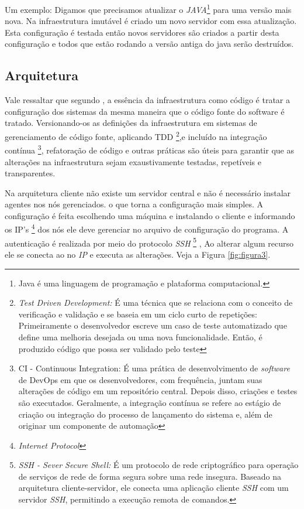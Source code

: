  Um exemplo: Digamos que precisamos atualizar o \textit{JAVA}\footnote{Java é uma linguagem de programação e plataforma computacional.} para uma versão mais nova. Na infraestrutura imutável é criado um novo servidor com essa atualização. Esta configuração é testada então novos servidores são criados a partir desta configuração e todos que estão rodando a versão antiga do java serão destruídos. 
 
\subsection{Arquitetura}

Vale ressaltar que segundo , a essência da infraestrutura como código é tratar a configuração dos sistemas da mesma maneira que o código fonte do software é tratado. Versionando-os as definições da infraestrutura em sistemas de gerenciamento de código fonte, aplicando TDD \footnote{\textit{Test Driven Development:} É uma técnica que se relaciona com o conceito de verificação e validação e se baseia em um ciclo curto de repetições: Primeiramente o desenvolvedor escreve um caso de teste automatizado que define uma melhoria desejada ou uma nova funcionalidade. Então, é produzido código que possa ser validado pelo teste},e incluído na integração contínua \footnote{CI - Continuous Integration: É uma prática de desenvolvimento de \textit{software} de DevOps em que os desenvolvedores, com frequência, juntam suas alterações de código em um repositório central. Depois disso, criações e testes são executados. Geralmente, a integração contínua se refere ao estágio de criação ou integração do processo de lançamento do sistema e, além de originar um componente de automação}, refatoração de código e outras práticas são úteis para garantir que as alterações na infraestrutura sejam exaustivamente testadas, repetíveis e transparentes.

Na arquitetura cliente não existe um servidor central e não é necessário instalar agentes nos nós gerenciados. 
o que torna a configuração mais simples. A configuração é feita escolhendo uma máquina e instalando o cliente e informando os IP's \footnote{\textit{Internet Protocol}} dos nós ele deve gerenciar no arquivo de configuração do programa. A autenticação é realizada por meio do protocolo \textit{SSH} \footnote{\textit{SSH - Sever Secure Shell:}  É um protocolo de rede criptográfico para operação de serviços de rede de forma segura sobre uma rede insegura. Baseado na arquitetura cliente-servidor, ele conecta uma aplicação cliente \textit{SSH} com um servidor \textit{SSH}, permitindo a execução remota de comandos.} , Ao alterar algum recurso ele se conecta ao no \textit{IP} e executa as alterações. Veja a Figura \ref{fig:figura3}. 

